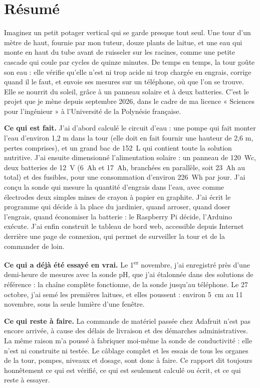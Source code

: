 \documentclass[11pt,a4paper]{article}
\begin{document}
\section*{Résumé}

Imaginez un petit potager vertical qui se garde presque tout seul. Une tour d'un mètre de haut, fournie par mon tuteur, douze plants de laitue, et une eau qui monte en haut du tube avant de ruisseler sur les racines, comme une petite cascade qui coule par cycles de quinze minutes. De temps en temps, la tour goûte son eau : elle vérifie qu'elle n'est ni trop acide ni trop chargée en engrais, corrige quand il le faut, et envoie ses mesures sur un téléphone, où que l'on se trouve. Elle se nourrit du soleil, grâce à un panneau solaire et à deux batteries. C'est le projet que je mène depuis septembre 2026, dans le cadre de ma licence « Sciences pour l'ingénieur » à l'Université de la Polynésie française.

\textbf{Ce qui est fait.} J'ai d'abord calculé le circuit d'eau : une pompe qui fait monter l'eau d'environ 1,2 m dans la tour (elle doit en fait fournir une hauteur de 2,6 m, pertes comprises), et un grand bac de \qty{152}{L} qui contient toute la solution nutritive. J'ai ensuite dimensionné l'alimentation solaire : un panneau de \qty{120}{Wc}, deux batteries de \qty{12}{V} (\qty{6}{Ah} et \qty{17}{Ah}, branchées en parallèle, soit \qty{23}{Ah} au total) et des fusibles, pour une consommation d'environ \qty{226}{Wh} par jour. J'ai conçu la sonde qui mesure la quantité d'engrais dans l'eau, avec comme électrodes deux simples mines de crayon à papier en graphite. J'ai écrit le programme qui décide à la place du jardinier, quand arroser, quand doser l'engrais, quand économiser la batterie : le Raspberry Pi décide, l'Arduino exécute. J'ai enfin construit le tableau de bord web, accessible depuis Internet derrière une page de connexion, qui permet de surveiller la tour et de la commander de loin.

\textbf{Ce qui a déjà été essayé en vrai.} Le 1\textsuperscript{er} novembre, j'ai enregistré près d'une demi-heure de mesures avec la sonde pH, que j'ai étalonnée dans des solutions de référence : la chaîne complète fonctionne, de la sonde jusqu'au téléphone. Le 27 octobre, j'ai semé les premières laitues, et elles poussent : environ \qty{5}{cm} au 11 novembre, sous la seule lumière d'une fenêtre.

\textbf{Ce qui reste à faire.} La commande de matériel passée chez Adafruit n'est pas encore arrivée, à cause des délais de livraison et des démarches administratives. La même raison m'a poussé à fabriquer moi-même la sonde de conductivité : elle n'est ni construite ni testée. Le câblage complet et les essais de tous les organes de la tour, pompes, niveaux et dosage, sont donc à faire. Ce rapport dit toujours honnêtement ce qui est vérifié, ce qui est seulement calculé ou écrit, et ce qui reste à essayer.
\end{document}

